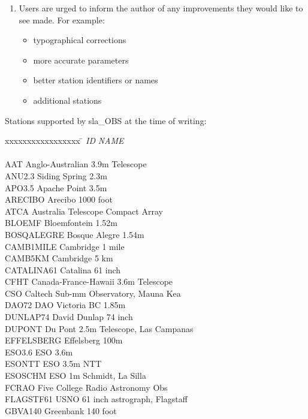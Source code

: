 \documentclass[11pt,twoside,nolof]{starlink}
\begin{document}
{\begin{enumerate}
  \item Users are urged to inform the author of any improvements
        they would like to see made.  For example:
        \begin{itemize}
         \item typographical corrections
         \item more accurate parameters
         \item better station identifiers or names
         \item additional stations
        \end{itemize}
 \end{enumerate}
Stations supported by sla\_OBS at the time of writing:

\begin{tabbing}
xxxxxxxxxxxxxxxxx \= \kill
\textit{ID} \> \textit{NAME} \\ \\
AAT \> Anglo-Australian 3.9m Telescope \\
ANU2.3 \> Siding Spring 2.3m \\
APO3.5 \> Apache Point 3.5m \\
ARECIBO \> Arecibo 1000 foot \\
ATCA \> Australia Telescope Compact Array \\
BLOEMF \> Bloemfontein 1.52m \\
BOSQALEGRE \> Bosque Alegre 1.54m \\
CAMB1MILE \> Cambridge 1 mile \\
CAMB5KM \> Cambridge 5 km \\
CATALINA61 \> Catalina 61 inch \\
CFHT \> Canada-France-Hawaii 3.6m Telescope \\
CSO \> Caltech Sub-mm Observatory, Mauna Kea \\
DAO72 \> DAO Victoria BC 1.85m \\
DUNLAP74 \> David Dunlap 74 inch \\
DUPONT \> Du Pont 2.5m Telescope, Las Campanas \\
EFFELSBERG \> Effelsberg 100m \\
ESO3.6 \> ESO 3.6m \\
ESONTT \> ESO 3.5m NTT \\
ESOSCHM \> ESO 1m Schmidt, La Silla \\
FCRAO \> Five College Radio Astronomy Obs \\
FLAGSTF61 \> USNO 61 inch astrograph, Flagstaff \\
GBVA140 \> Greenbank 140 foot \\

\end{tabbing}}
\end{document}
